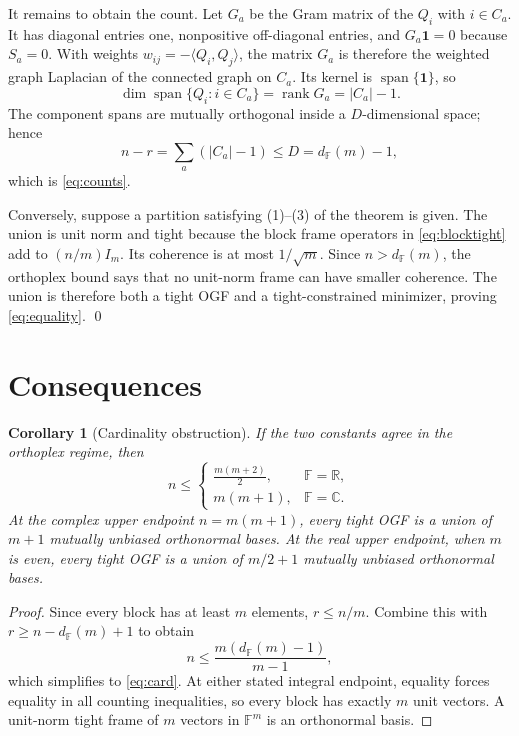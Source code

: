 \documentclass[10pt]{article}
\newtheorem{corollary}[theorem]{Corollary}
\newcommand{\F}{\mathbb F}
\newcommand{\R}{\mathbb R}
\newcommand{\C}{\mathbb C}
\begin{document}
It remains to obtain the count.  Let $G_a$ be the Gram matrix of the
$Q_i$ with $i\in C_a$.  It has diagonal entries one, nonpositive
off-diagonal entries, and $G_a\mathbf1=0$ because $S_a=0$.  With weights
$w_{ij}=-\langle Q_i,Q_j\rangle$, the matrix $G_a$ is therefore the weighted
graph Laplacian of the connected graph on $C_a$.  Its kernel is
$\operatorname{span}\{\mathbf1\}$, so
\[
 \dim\operatorname{span}\{Q_i:i\in C_a\}=\operatorname{rank}G_a=|C_a|-1.
\]
The component spans are mutually orthogonal inside a $D$-dimensional space;
hence
\[
 n-r=\sum_a(|C_a|-1)\leq D=d_{\F}(m)-1,
\]
which is \eqref{eq:counts}.

Conversely, suppose a partition satisfying (1)--(3) of the theorem is
given.  The union is unit norm and tight because the block frame operators
in \eqref{eq:blocktight} add to $(n/m)I_m$.  Its coherence is at most
$1/\sqrt m$.  Since $n>d_{\F}(m)$, the orthoplex bound says that no
unit-norm frame can have smaller coherence.  The union is therefore both a
tight OGF and a tight-constrained minimizer, proving \eqref{eq:equality}. \qed

\section{Consequences}

\begin{corollary}[Cardinality obstruction]\label{cor:card}
If the two constants agree in the orthoplex regime, then
\begin{equation}\label{eq:card}
 n\leq
 \begin{cases}
  \displaystyle\frac{m(m+2)}2,&\F=\R,\\[4pt]
  m(m+1),&\F=\C.
 \end{cases}
\end{equation}
At the complex upper endpoint $n=m(m+1)$, every tight OGF is a union of
$m+1$ mutually unbiased orthonormal bases.  At the real upper endpoint, when
$m$ is even, every tight OGF is a union of $m/2+1$ mutually unbiased
orthonormal bases.
\end{corollary}

\begin{proof}
Since every block has at least $m$ elements, $r\leq n/m$.  Combine this with
$r\geq n-d_{\F}(m)+1$ to obtain
\[
 n\leq\frac{m(d_{\F}(m)-1)}{m-1},
\]
which simplifies to \eqref{eq:card}.  At either stated integral endpoint, equality
forces equality in all counting inequalities, so every block has exactly
$m$ unit vectors.  A unit-norm tight frame of $m$ vectors in $\F^m$ is an
orthonormal basis.
\end{proof}
\end{document}
